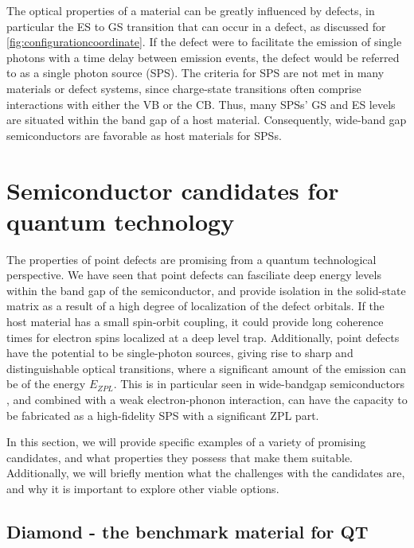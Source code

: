 The optical properties of a material can be greatly influenced by defects, in particular the ES to GS transition that can occur in a defect, as discussed for \autoref{fig:configurationcoordinate}. If the defect were to facilitate the emission of single photons with a time delay between emission events, the defect would be referred to as a single photon source (SPS). The criteria for SPS are not met in many materials or defect systems, since charge-state transitions often comprise interactions with either the VB or the CB. Thus, many SPSs' GS and ES levels are situated within the band gap of a host material. Consequently, wide-band gap semiconductors are favorable as host materials for SPSs.

\section{Semiconductor candidates for quantum technology}

The properties of point defects are promising from a quantum technological perspective. We have seen that point defects can fasciliate deep energy levels within the band gap of the semiconductor, and provide isolation in the solid-state matrix as a result of a high degree of localization of the defect orbitals. If the host material has a small spin-orbit coupling, it could provide long coherence times for electron spins localized at a deep level trap. Additionally, point defects have the potential to be single-photon sources, giving rise to sharp and distinguishable optical transitions, where a significant amount of the emission can be of the energy $E_{ZPL}$. This is in particular seen in wide-bandgap semiconductors \cite{Gordon2013, Weber2010}, and combined with a weak electron-phonon interaction, can have the capacity to be fabricated as a high-fidelity SPS with a significant ZPL part.

In this section, we will provide specific examples of a variety of promising candidates, and what properties they possess that make them suitable. Additionally, we will briefly mention what the challenges with the candidates are, and why it is important to explore other viable options.

\subsection{Diamond - the benchmark material for QT}
\label{diamond}



